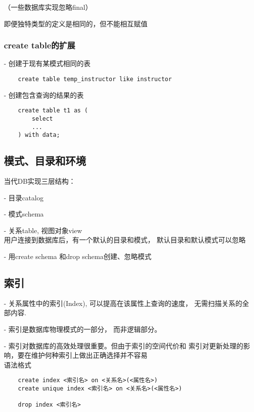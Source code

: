 \documentclass{article}        %
\begin{document}
（一些数据库实现忽略final）

即便独特类型的定义是相同的，但不能相互赋值 

\subsubsection{create table的扩展}

- 创建于现有某模式相同的表 

\begin{verbatim}
    create table temp_instructor like instructor 
\end{verbatim}

- 创建包含查询的结果的表

\begin{verbatim} 
    create table t1 as (
        select 
        ...
    ) with data;
\end{verbatim}


\subsection{模式、目录和环境}

当代DB实现三层结构：

- 目录catalog 

- 模式schema 

- 关系table, 视图对象view \\ 

用户连接到数据库后，有一个默认的目录和模式，
默认目录和默认模式可以忽略 

- 用create schema 和drop schema创建、忽略模式 

\subsection{索引}

- 关系属性中的索引(Index), 可以提高在该属性上查询的速度，
无需扫描关系的全部内容.

- 索引是数据库物理模式的一部分，
而非逻辑部分。

- 索引对数据库的高效处理很重要。但由于索引的空间代价和
索引对更新处理的影响，要在维护何种索引上做出正确选择并不容易 \\ 

语法格式

\begin{verbatim} 
    create index <索引名> on <关系名>(<属性名>)
    create unique index <索引名> on <关系名>(<属性名>)

    drop index <索引名>
\end{verbatim}
\end{document}

